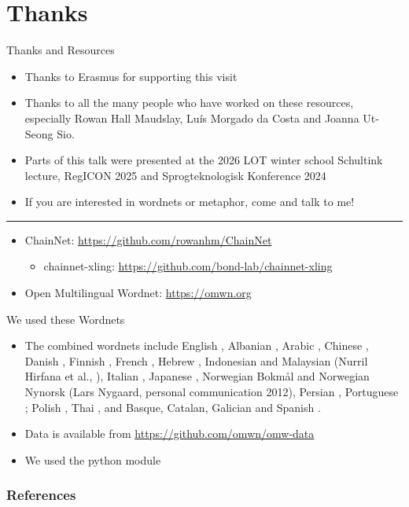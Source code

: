 \documentclass[xetex]{beamer}
\begin{document}
\section{Thanks}

\begin{frame}{Thanks and Resources}

  \begin{itemize}
  \item Thanks to Erasmus for supporting this visit
  \item Thanks to all the many people who have worked on these
    resources, especially  Rowan Hall Maudslay, Luís Morgado da Costa and Joanna Ut-Seong Sio.
  \item Parts of this talk were presented at the 2026 LOT winter
    school Schultink lecture, 
    RegICON 2025 and Sprogteknologisk Konference 2024
  \item If you are interested in wordnets or metaphor, come and talk to me!
  \end{itemize}
  \medskip
  \hrule
  \medskip
  \begin{itemize}
  \item ChainNet: \url{https://github.com/rowanhm/ChainNet}
    \begin{itemize}
    \item chainnet-xling: \url{https://github.com/bond-lab/chainnet-xling}
    \end{itemize}
  \item Open Multilingual Wordnet: \url{https://omwn.org}
  \end{itemize}

  
\end{frame}

\begin{frame}{We used these Wordnets}
  \begin{itemize}
  \item The combined wordnets include 
English \citep{_Fellbaum:1998}, 
Albanian \citep{Ruci:2008}, 
Arabic \citep{Black:Elkateb:Rodriguez:Alkhalifa:Vossen:Pease:Bertran:Fellbaum:2006}, 
Chinese \citep{Huang:Hsieh:Hong:Chen:Su:Chen:Huang:2010}, 
Danish \citep{Pedersen:2009}, 
Finnish \citep{Linden:Carlson:2010}, 
French \citep{Sagot:Fiser:2008}, 
Hebrew \citep{Ordan:Wintner:2007},
Indonesian and Malaysian (Nurril Hirfana et al., \citeyear{Noor:Sapuan:Bond:2011}), 
Italian \citep{Pianta:Bentivogli:Girardi:2002,Toral:Bracale:Monachini:Soria:2010}, 
Japanese \citep{Isahara:Bond:Uchimoto:Utiyama:Kanzaki:2008}, 
Norwegian Bokm\r{a}l and Norwegian Nynorsk (Lars Nygaard, personal communication 2012),
Persian \citep{Montazery:Faili:2010}, 
Portuguese \citep{Paiva:Rademaker:2012};
Polish \citep{Piasecki:Szpakowicz:Broda:2009}, 
Thai \citep{Thoongsup:Charoenporn:Robkop:Sinthurahat:Mokarat:Sornlertlamvanich:Isahara:2009},
and Basque, Catalan, Galician and Spanish \citep{Gonzalez-Agirre:Laparra:Rigau:2012}.
\item Data is available from \url{https://github.com/omwn/omw-data}
\item We used the python  module \citep{Goodman:Bond:2021}
\end{itemize}
\end{frame}

\begin{frame}[allowframebreaks]
        \frametitle{References}
        
        
\end{frame}
\end{document}
